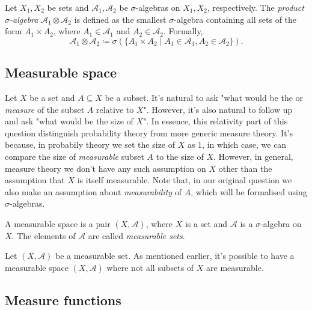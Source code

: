 \begin{definition}
    Let $X_1, X_2$ be sets and $\mathcal{A}_1, \mathcal{A}_2$ be $\sigma$-algebras on $X_1, X_2$, respectively. The \emph{product $\sigma$-algebra} $\mathcal{A}_1 \otimes \mathcal{A}_2$ is defined as the smallest $\sigma$-algebra containing all sets of the form $A_1 \times A_2$, where $A_1 \in \mathcal{A}_1$ and $A_2 \in \mathcal{A}_2$. Formally,
    \[
        \mathcal{A}_1 \otimes \mathcal{A}_2 \coloneq \sigma\left(\{A_1 \times A_2 \mid A_1 \in \mathcal{A}_1, A_2 \in \mathcal{A}_2\}\right).
    \]
\end{definition}

\subsection{Measurable space}

Let $X$ be a set and $A \subseteq X$ be a subset. It's natural to ask "what would be the  or \textit{measure} of the subset $A$ relative to $X$". However, it's also natural to follow up and ask "what would be the size of $X$". In essence, this relativity part of this question distinguish probability theory from more generic measure theory. It's because, in probabily theory we set the size of $X$ as $1$, in which case, we can compare the size of \textit{measurable} subset $A$ to the size of $X$. However, in general, measure theory we don't have any such assumption on $X$ other than the assumption that $X$ is itself measurable. Note that, in our original question we also make an assumption about \textit{measurability} of $A$, which will be formalised using $\sigma$-algebras.

\begin{definition}
    A measurable space is a pair $(X, \mathcal{A})$, where $X$ is a set and $\mathcal{A}$ is a $\sigma$-algebra on $X$. The elements of $\mathcal{A}$ are called \emph{measurable sets}.
\end{definition}

Let $(X, \mathcal{A})$ be a measurable set. As mentioned earlier, it's possible to have a measurable space $(X, \mathcal{A})$ where not all subsets of $X$ are measurable.

\subsection{Measure functions}\label{subsec:measure-functions}

